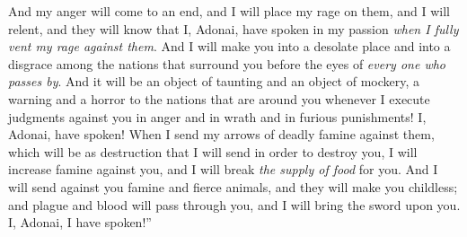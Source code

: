 \begin{biblechapter}
\verse And my anger will come to an end, and I will place my rage on them, and I will relent, and they will know that I, Adonai, have spoken in my passion \textit{when I fully vent my rage against them}.
\verse And I will make you into a desolate place and into a disgrace among the nations that surround you before the eyes of \textit{every one who passes by}.
\verse And it will be an object of taunting and an object of mockery, a warning and a horror to the nations that are around you whenever I execute judgments against you in anger and in wrath and in furious punishments! I, Adonai, have spoken!
\verse When I send my arrows of deadly famine against them, which will be as destruction that I will send in order to destroy you, I will increase famine against you, and I will break \textit{the supply of food} for you.
\verse And I will send against you famine and fierce animals, and they will make you childless; and plague and blood will pass through you, and I will bring the sword upon you. I, Adonai, I have spoken!”
\end{biblechapter}

